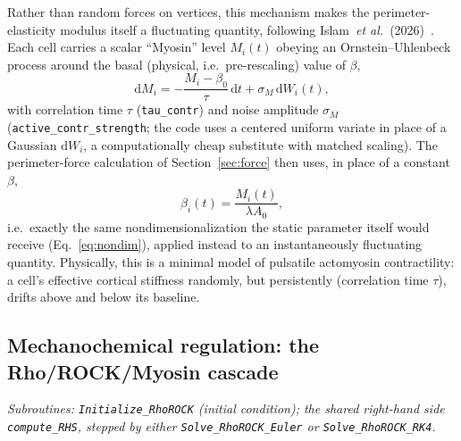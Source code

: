 \documentclass[11pt]{article}
\newcommand{\ord}{\mathrm{d}}
\begin{document}
Rather than random forces on vertices, this mechanism makes the perimeter-elasticity
modulus itself a fluctuating quantity, following Islam~\emph{et
al.}~(2026)~\cite{islam2026}. Each cell carries a scalar ``Myosin'' level $M_i(t)$
obeying an Ornstein--Uhlenbeck process around the basal (physical, i.e.\
pre-rescaling) value of $\beta$,
\begin{equation}
  \ord M_i = -\frac{M_i - \beta_0}{\tau}\,\ord t + \sigma_M\,\ord W_i(t),
  \label{eq:ou-contractility}
\end{equation}
with correlation time $\tau$ (\texttt{tau\_contr}) and noise amplitude $\sigma_M$
(\texttt{active\_\allowbreak contr\_\allowbreak strength}; the code uses a centered uniform variate in place of
a Gaussian $\ord W_i$, a computationally cheap substitute with matched scaling). The
perimeter-force calculation of Section~\ref{sec:force} then uses, in place of a
constant $\beta$,
\begin{equation}
  \beta_i(t) = \frac{M_i(t)}{\lambda A_0},
  \label{eq:beta-contractility}
\end{equation}
i.e.\ exactly the same nondimensionalization the static parameter itself would receive
(Eq.~\eqref{eq:nondim}), applied instead to an instantaneously fluctuating quantity.
Physically, this is a minimal model of pulsatile actomyosin contractility: a cell's
effective cortical stiffness randomly, but persistently (correlation time $\tau$),
drifts above and below its baseline.

\subsection{Mechanochemical regulation: the Rho/ROCK/Myosin cascade}
\label{sec:rhorock}
\textit{Subroutines: \texttt{Initialize\_RhoROCK} (initial condition); the shared
right-hand side \texttt{compute\_RHS}, stepped by either \texttt{Solve\_\allowbreak RhoROCK\_\allowbreak Euler}
or \texttt{Solve\_\allowbreak RhoROCK\_\allowbreak RK4}.}
\end{document}
